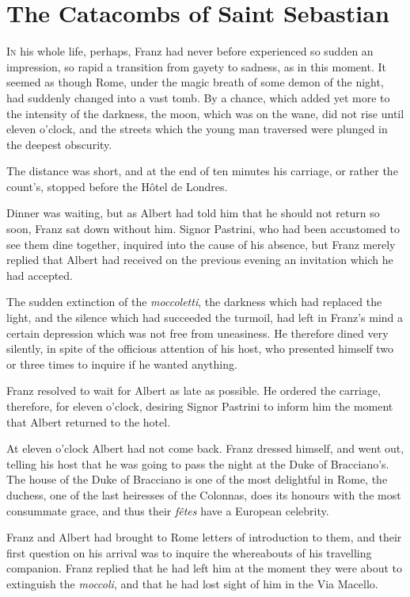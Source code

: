 \chapter{The Catacombs of Saint Sebastian} 

 \lettrine{I}{n} his whole life, perhaps, Franz had never before experienced so sudden an impression, so rapid a transition from gayety to sadness, as in this moment. It seemed as though Rome, under the magic breath of some demon of the night, had suddenly changed into a vast tomb. By a chance, which added yet more to the intensity of the darkness, the moon, which was on the wane, did not rise until eleven o'clock, and the streets which the young man traversed were plunged in the deepest obscurity. 

 The distance was short, and at the end of ten minutes his carriage, or rather the count's, stopped before the Hôtel de Londres. 

 Dinner was waiting, but as Albert had told him that he should not return so soon, Franz sat down without him. Signor Pastrini, who had been accustomed to see them dine together, inquired into the cause of his absence, but Franz merely replied that Albert had received on the previous evening an invitation which he had accepted. 

 The sudden extinction of the \textit{moccoletti}, the darkness which had replaced the light, and the silence which had succeeded the turmoil, had left in Franz's mind a certain depression which was not free from uneasiness. He therefore dined very silently, in spite of the officious attention of his host, who presented himself two or three times to inquire if he wanted anything. 

 Franz resolved to wait for Albert as late as possible. He ordered the carriage, therefore, for eleven o'clock, desiring Signor Pastrini to inform him the moment that Albert returned to the hotel. 

 At eleven o'clock Albert had not come back. Franz dressed himself, and went out, telling his host that he was going to pass the night at the Duke of Bracciano's. The house of the Duke of Bracciano is one of the most delightful in Rome, the duchess, one of the last heiresses of the Colonnas, does its honours with the most consummate grace, and thus their \textit{fêtes} have a European celebrity. 

 Franz and Albert had brought to Rome letters of introduction to them, and their first question on his arrival was to inquire the whereabouts of his travelling companion. Franz replied that he had left him at the moment they were about to extinguish the \textit{moccoli}, and that he had lost sight of him in the Via Macello. 


